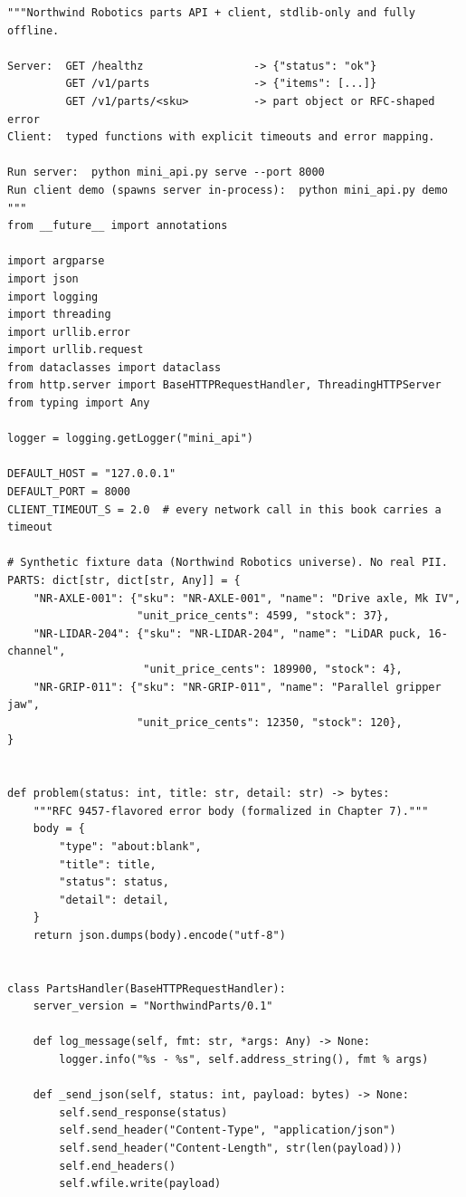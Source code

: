 \begin{verbatim}
"""Northwind Robotics parts API + client, stdlib-only and fully offline.

Server:  GET /healthz                 -> {"status": "ok"}
         GET /v1/parts                -> {"items": [...]}
         GET /v1/parts/<sku>          -> part object or RFC-shaped error
Client:  typed functions with explicit timeouts and error mapping.

Run server:  python mini_api.py serve --port 8000
Run client demo (spawns server in-process):  python mini_api.py demo
"""
from __future__ import annotations

import argparse
import json
import logging
import threading
import urllib.error
import urllib.request
from dataclasses import dataclass
from http.server import BaseHTTPRequestHandler, ThreadingHTTPServer
from typing import Any

logger = logging.getLogger("mini_api")

DEFAULT_HOST = "127.0.0.1"
DEFAULT_PORT = 8000
CLIENT_TIMEOUT_S = 2.0  # every network call in this book carries a timeout

# Synthetic fixture data (Northwind Robotics universe). No real PII.
PARTS: dict[str, dict[str, Any]] = {
    "NR-AXLE-001": {"sku": "NR-AXLE-001", "name": "Drive axle, Mk IV",
                    "unit_price_cents": 4599, "stock": 37},
    "NR-LIDAR-204": {"sku": "NR-LIDAR-204", "name": "LiDAR puck, 16-channel",
                     "unit_price_cents": 189900, "stock": 4},
    "NR-GRIP-011": {"sku": "NR-GRIP-011", "name": "Parallel gripper jaw",
                    "unit_price_cents": 12350, "stock": 120},
}


def problem(status: int, title: str, detail: str) -> bytes:
    """RFC 9457-flavored error body (formalized in Chapter 7)."""
    body = {
        "type": "about:blank",
        "title": title,
        "status": status,
        "detail": detail,
    }
    return json.dumps(body).encode("utf-8")


class PartsHandler(BaseHTTPRequestHandler):
    server_version = "NorthwindParts/0.1"

    def log_message(self, fmt: str, *args: Any) -> None:
        logger.info("%s - %s", self.address_string(), fmt % args)

    def _send_json(self, status: int, payload: bytes) -> None:
        self.send_response(status)
        self.send_header("Content-Type", "application/json")
        self.send_header("Content-Length", str(len(payload)))
        self.end_headers()
        self.wfile.write(payload)


\end{verbatim}
